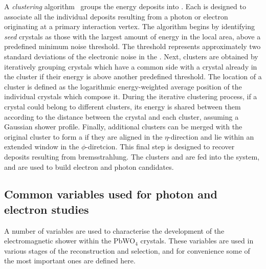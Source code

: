 A \emph{clustering} algorithm~\cite{CMS-PAS-EGM-13-001,CMS-PAS-EGM-14-001} groups the \ECAL energy deposits into \SC\s. Each \SC is designed to associate all the individual deposits resulting from a photon or electron originating at a primary interaction vertex.
The algorithm begins by identifying \emph{seed} crystals as those with the largest amount of energy in the local area, above a predefined minimum noise threshold. The threshold %
represents approximately two standard deviations of the electronic noise in the \ECAL. Next, clusters are obtained by iteratively grouping crystals which have a common side with a crystal already in the cluster if their energy is above another predefined threshold. The location of a cluster is defined as the logarithmic energy-weighted average position of the individual crystals which compose it. During the iterative clustering process, if a crystal could belong to different clusters, its energy is shared between them according to the distance between the crystal and each cluster, assuming a Gaussian shower profile. Finally, additional clusters can be merged with the original cluster to form a \SC if they are aligned in the $\eta$-direction and lie within an extended window in the $\phi$-diretcion. This final step is designed to recover deposits resulting from bremsstrahlung.
The clusters and \SC\s are fed into the \PF system, and are used to build electron and photon candidates.

\subsection{Common variables used for photon and electron studies}
\label{sec:reco:photon:showershapes}

A number of variables are used to characterise the development of the electromagnetic shower within the PbWO$_4$ crystals. These variables are used in various stages of the reconstruction and selection, and for convenience some of the most important ones are defined here.
%

